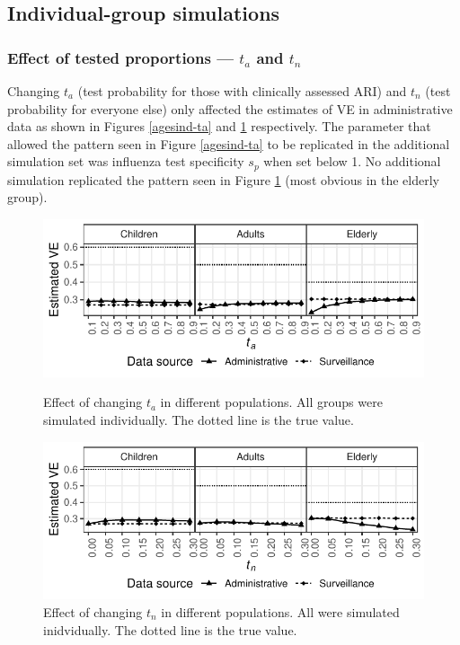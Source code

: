 \documentclass[11pt]{article}
\begin{document}
\subsection{Individual-group simulations}

\subsubsection{Effect of tested proportions --- $t_a$ and $t_n$}

Changing $t_a$ (test probability for those with clinically assessed ARI) and $t_n$ (test probability for everyone else) only affected the estimates of VE in administrative data as shown in Figures \ref{agesind-ta} and \ref{agesind-tn} respectively. The parameter that allowed the pattern seen in Figure \ref{agesind-ta} to be replicated in the additional simulation set was influenza test specificity $s_p$ when set below 1. No additional simulation replicated the pattern seen in Figure \ref{agesind-tn} (most obvious in the elderly group).

\begin{figure}[H]
	\centering
		\includegraphics[width=.75\linewidth]{../fig-agesind/agesind-test_clin.pdf}
		\caption{
Effect of changing $t_a$ in different populations. All groups were simulated individually. The dotted line is the true value. \label{agesind-ta}
		}
		\includegraphics[width=.75\linewidth]{../fig-agesind/agesind-test_nonclin.pdf}
		\caption{
Effect of changing $t_n$ in different populations. All were simulated inidvidually. The dotted line is the true value. \label{agesind-tn}
		}
\end{figure}
\end{document}

